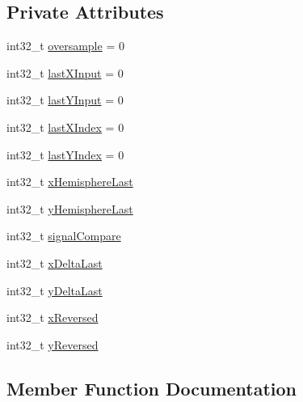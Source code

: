 \subsection*{Private Attributes}
\begin{DoxyCompactItemize}
\item 
int32\+\_\+t \mbox{\hyperlink{class_three_axis_scanner_ab0a1b67b6c62a8299cb77a38a96c97f9}{oversample}} = 0
\item 
int32\+\_\+t \mbox{\hyperlink{class_three_axis_scanner_a0005b8d39210e262e5250be3c6915370}{last\+X\+Input}} = 0
\item 
int32\+\_\+t \mbox{\hyperlink{class_three_axis_scanner_a9f2d830414c641ff7e56b4c2bb24ad2c}{last\+Y\+Input}} = 0
\item 
int32\+\_\+t \mbox{\hyperlink{class_three_axis_scanner_aaff13e6600ee25694960accfa89e61ac}{last\+X\+Index}} = 0
\item 
int32\+\_\+t \mbox{\hyperlink{class_three_axis_scanner_a9555d7dccbce08f2d3be607fc28fb99a}{last\+Y\+Index}} = 0
\item 
int32\+\_\+t \mbox{\hyperlink{class_three_axis_scanner_aded2ed55f7b977b2c215035bfe78ac07}{x\+Hemisphere\+Last}}
\item 
int32\+\_\+t \mbox{\hyperlink{class_three_axis_scanner_a9fa73514ec9297aa5a4199cbd13427c0}{y\+Hemisphere\+Last}}
\item 
int32\+\_\+t \mbox{\hyperlink{class_three_axis_scanner_ae0b7e566ef7f99732871fe5f467c4691}{signal\+Compare}}
\item 
int32\+\_\+t \mbox{\hyperlink{class_three_axis_scanner_af3b467e4b90a698653d8940a50c5bdd1}{x\+Delta\+Last}}
\item 
int32\+\_\+t \mbox{\hyperlink{class_three_axis_scanner_a9c8557a9927184faa7ba84f6c9c8d5dd}{y\+Delta\+Last}}
\item 
int32\+\_\+t \mbox{\hyperlink{class_three_axis_scanner_a0c65fb8677a6c717b44fd4e927a8b686}{x\+Reversed}}
\item 
int32\+\_\+t \mbox{\hyperlink{class_three_axis_scanner_a2517bc1e2371562ba91a18cc1e58d9ba}{y\+Reversed}}
\end{DoxyCompactItemize}


\subsection{Member Function Documentation}
\mbox{\label{class_three_axis_scanner_aa2bcef759f2a4bac59f38bf23e3cb318}} 
